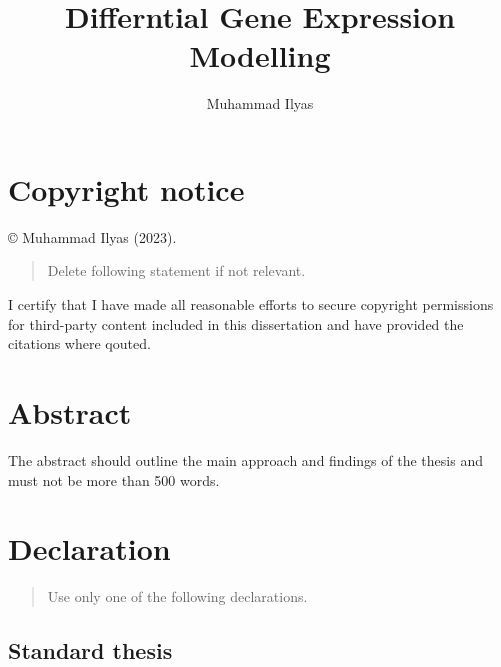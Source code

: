 \documentclass{uniexeterthesis}
\author{Muhammad Ilyas}
\title{Differntial Gene Expression Modelling}
\begin{document}

\titlepage

{\sf\tighttoc\doublespacing}


\hypertarget{copyright-notice}{%
\chapter*{Copyright notice}\label{copyright-notice}}


© Muhammad Ilyas (2023).

\begin{quote}
Delete following statement if not relevant.
\end{quote}

I certify that I have made all reasonable efforts to secure copyright
permissions for third-party content included in this dissertation and have provided the citations where qouted.


\hypertarget{abstract}{%
\chapter*{Abstract}\label{abstract}}


The abstract should outline the main approach and findings of the thesis
and must not be more than 500 words.


\hypertarget{declaration}{%
\chapter*{Declaration}\label{declaration}}


\begin{quote}
Use only one of the following declarations.
\end{quote}

\hypertarget{standard-thesis}{%
\section*{Standard thesis}\label{standard-thesis}}
\end{document}
